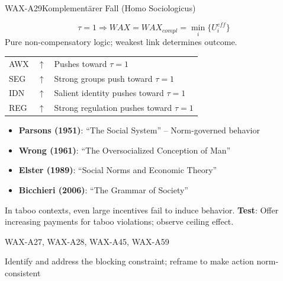 \begin{axiomspec}{WAX-A29}{Komplementärer Fall (Homo Sociologicus)}

\begin{equation}
\tau = 1 \Rightarrow WAX = WAX_{compl} = \min_i\{U_i^{eff}\}
\end{equation}
Pure non-compensatory logic; weakest link determines outcome.

\begin{tabular}{lll}
AWX & $\uparrow$ & Pushes toward $\tau = 1$ \\
SEG & $\uparrow$ & Strong groups push toward $\tau = 1$ \\
IDN & $\uparrow$ & Salient identity pushes toward $\tau = 1$ \\
REG & $\uparrow$ & Strong regulation pushes toward $\tau = 1$ \\
\end{tabular}

\begin{itemize}
\item \textbf{Parsons (1951)}: ``The Social System'' -- Norm-governed behavior
\item \textbf{Wrong (1961)}: ``The Oversocialized Conception of Man''
\item \textbf{Elster (1989)}: ``Social Norms and Economic Theory''
\item \textbf{Bicchieri (2006)}: ``The Grammar of Society''
\end{itemize}

In taboo contexts, even large incentives fail to induce behavior.
\textbf{Test}: Offer increasing payments for taboo violations; observe ceiling effect.

WAX-A27, WAX-A28, WAX-A45, WAX-A59

Identify and address the blocking constraint; reframe to make action norm-consistent

\end{axiomspec}



